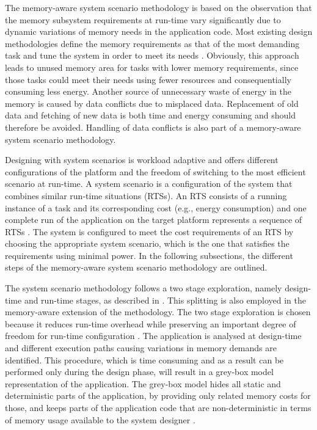 \documentclass[smallextended]{svjour3}
\begin{document}
The memory-aware system scenario methodology is based on the observation that the memory subsystem requirements at run-time vary significantly due to dynamic variations of memory needs in the application code. 
Most existing design methodologies define the memory requirements as that of the most demanding task and tune the system in order to meet its needs \cite{tcm}. 
Obviously, this approach leads to unused memory area for tasks with lower memory requirements, since those tasks could meet their needs using fewer resources and consequentially consuming less energy. 
Another source of unnecessary waste of energy in the memory is caused by data conflicts due to misplaced data. 
Replacement of old data and fetching of new data is both time and energy consuming and should therefore be avoided. 
Handling of data conflicts is also part of a memory-aware system scenario methodology.

Designing with system scenarios is workload adaptive and offers different configurations of the platform and the freedom of switching to the most efficient scenario at run-time. 
A system scenario is a configuration of the system that combines similar run-time situations (RTSs). 
An RTS consists of a running instance of a task and its corresponding cost (e.g., energy consumption) and one complete run of the application on the target platform represents a sequence of RTSs \cite{Elena2010}. 
The system is configured to meet the cost requirements of an RTS by choosing the appropriate system scenario, which is the one that satisfies the requirements using minimal power. 
In the following subsections, the different steps of the memory-aware system scenario methodology are outlined. 

The system scenario methodology follows a two stage exploration, namely design-time and run-time stages, as described in \cite{Gheorghita2007}. 
This splitting is also employed in the memory-aware extension of the methodology. 
The two stage exploration is chosen because it reduces run-time overhead while preserving an important degree of freedom for run-time configuration \cite{tcm}. 
The application is analysed at design-time and different execution paths causing variations in memory demands are identified. 
This procedure, which is time consuming and as a result can be performed only during the design phase, will result in a grey-box model representation of the application. 
The grey-box model hides all static and deterministic parts of the application, by providing only related memory costs for those, and keeps parts of the application code that are non-deterministic in terms of memory usage available to the system designer \cite{graybox}. 
\end{document}
